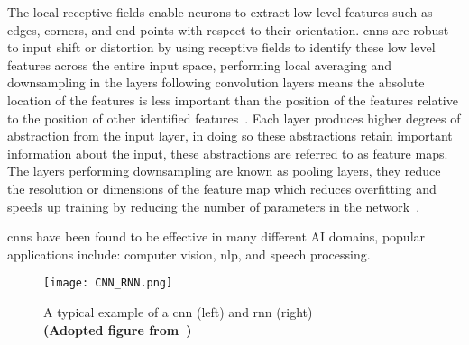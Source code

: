 \documentclass[../../D1.tex]{subfiles}
\begin{document}
The local receptive fields enable neurons to extract low level features such as edges, corners, and end-points with respect to their orientation. 
\Acrshort{cnn}s are robust to input shift or distortion by using receptive fields to identify these low level features across the entire input space, performing local averaging and downsampling in the layers following convolution layers means the absolute location of the features is less important than the position of the features relative to the position of other identified features~\autocite{lecunConvolutionalNetworksImages}. 
Each layer produces higher degrees of abstraction from the input layer, in doing so these abstractions retain important information about the input, these abstractions are referred to as feature maps.
The layers performing downsampling are known as pooling layers, they reduce the resolution or dimensions of the feature map which reduces overfitting and speeds up training by reducing the number of parameters in the network~\autocite{pouyanfarSurveyDeepLearning2019}.


\acrshort{cnn}s have been found to be effective in many different AI domains, popular applications include: computer vision, \Acrshort{nlp}, and speech processing. 

\begin{figure}
    \texttt{[image: CNN\_RNN.png]} 
    \caption{A typical example of a \acrshort*{cnn} (left) and \acrshort{rnn} (right)\\ \textbf{(Adopted figure from~\autocite{chenDeepLearningMobile2020})}}
    \label{fig:exampleCnnRnn}   
\end{figure}
\end{document}
